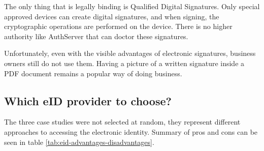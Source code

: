 The only thing that is legally binding is Qualified Digital Signatures. Only special approved devices can create digital signatures, and when signing, the cryptographic operations are performed on the device. There is no higher authority like AuthServer that can doctor these signatures.

Unfortunately, even with the visible advantages of electronic signatures, business owners still do not use them. Having a picture of a written signature inside a PDF document remains a popular way of doing business.


\subsection{Which eID provider to choose?}

The three case studies were not selected at random, they represent different approaches to accessing the electronic identity. Summary of pros and cons can be seen in table \ref{tab:eid-advantages-disadvantages}.

